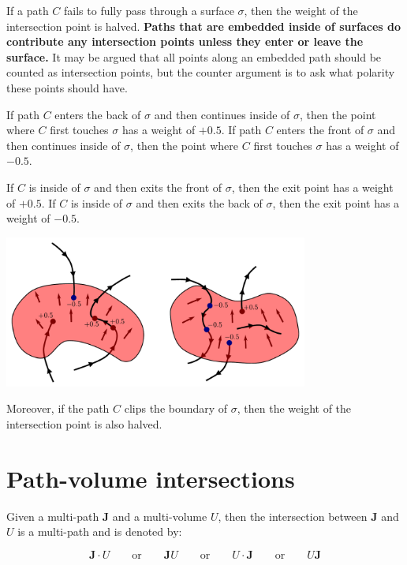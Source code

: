 If a path \(C\) fails to fully pass through a surface \(\sigma\), then the weight of the intersection point is halved. {\bf Paths that are embedded inside of surfaces do contribute any intersection points unless they enter or leave the surface.} It may be argued that all points along an embedded path should be counted as intersection points, but the counter argument is to ask what polarity these points should have.

If path \(C\) enters the back of \(\sigma\) and then continues inside of \(\sigma\), then the point where \(C\) first touches \(\sigma\) has a weight of \(+0.5\). If path \(C\) enters the front of \(\sigma\) and then continues inside of \(\sigma\), then the point where \(C\) first touches \(\sigma\) has a weight of \(-0.5\). 

If \(C\) is inside of \(\sigma\) and then exits the front of \(\sigma\), then the exit point has a weight of \(+0.5\). If \(C\) is inside of \(\sigma\) and then exits the back of \(\sigma\), then the exit point has a weight of \(-0.5\). 

\begin{center}
\includegraphics[width = 0.75\textwidth]{Intersections/Path-surface_intersections/path_surface_intersection_boundary_case}
\end{center}

Moreover, if the path \(C\) clips the boundary of \(\sigma\), then the weight of the intersection point is also halved.





\section{Path-volume intersections}

Given a multi-path \(\mathbf{J}\) and a multi-volume \(U\), then the intersection between \(\mathbf{J}\) and \(U\) is a multi-path and is denoted by:

\[\mathbf{J} \cdot U \quad\quad\text{or}\quad\quad \mathbf{J} U \quad\quad\text{or}\quad\quad U \cdot \mathbf{J} \quad\quad\text{or}\quad\quad U \mathbf{J}\]


